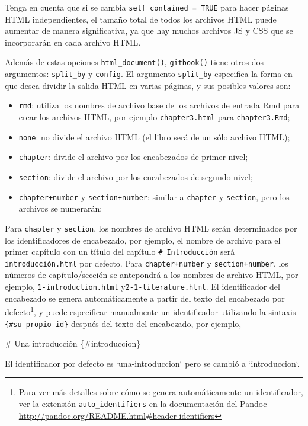 \documentclass[12pt,]{krantz}
\makeatletter
\newenvironment{Shaded}{\begin{snugshade}}{\end{snugshade}}
\newcommand{\BaseNTok}[1]{\textcolor[rgb]{0.00,0.00,0.81}{#1}}
\newcommand{\FunctionTok}[1]{\textcolor[rgb]{0.00,0.00,0.00}{#1}}
\newcommand{\NormalTok}[1]{#1}
\providecommand{\tightlist}{%
  \setlength{\itemsep}{0pt}\setlength{\parskip}{0pt}}
\newenvironment{kframe}{%
\medskip{}
\setlength{\fboxsep}{.8em}
 \def\at@end@of@kframe{}%
 \ifinner\ifhmode%
  \def\at@end@of@kframe{\end{minipage}}%
  \begin{minipage}{\columnwidth}%
 \fi\fi%
 \def\FrameCommand##1{\hskip\@totalleftmargin \hskip-\fboxsep
 \colorbox{shadecolor}{##1}\hskip-\fboxsep
     \hskip-\linewidth \hskip-\@totalleftmargin \hskip\columnwidth}%
 \MakeFramed {\advance\hsize-\width
   \@totalleftmargin\z@ \linewidth\hsize
   \@setminipage}}%
 {\par\unskip\endMakeFramed%
 \at@end@of@kframe}
\renewenvironment{Shaded}{\begin{kframe}}{\end{kframe}}
\theoremstyle{definition}
\theoremstyle{definition}
\theoremstyle{definition}
\theoremstyle{remark}
\makeatother
\begin{document}
Tenga en cuenta que si se cambia \texttt{self\_contained\ =\ TRUE} para
hacer páginas HTML independientes, el tamaño total de todos los archivos
HTML puede aumentar de manera significativa, ya que hay muchos archivos
JS y CSS que se incorporarán en cada archivo HTML.

Además de estas opciones \texttt{html\_document()}, \texttt{gitbook()}
tiene otros dos argumentos: \texttt{split\_by} y \texttt{config}. El
argumento \texttt{split\_by} especifica la forma en que desea dividir la
salida HTML en varias páginas, y sus posibles valores son:

\begin{itemize}
\tightlist
\item
  \texttt{rmd}: utiliza los nombres de archivo base de los archivos de
  entrada Rmd para crear los archivos HTML, por ejemplo
  \texttt{chapter3.html} para \texttt{chapter3.Rmd};
\item
  \texttt{none}: no divide el archivo HTML (el libro será de un sólo
  archivo HTML);
\item
  \texttt{chapter}: divide el archivo por los encabezados de primer
  nivel;
\item
  \texttt{section}: divide el archivo por los encabezados de segundo
  nivel;
\item
  \texttt{chapter+number} y \texttt{section+number}: similar a
  \texttt{chapter} y \texttt{section}, pero los archivos se numerarán;
\end{itemize}

Para \texttt{chapter} y \texttt{section}, los nombres de archivo HTML
serán determinados por los identificadores de encabezado, por ejemplo,
el nombre de archivo para el primer capítulo con un título del capítulo
\texttt{\#\ Introducción} será \texttt{introducción.html} por defecto.
Para \texttt{chapter+number} y \texttt{section+number}, los números de
capítulo/sección se antepondrá a los nombres de archivo HTML, por
ejemplo, \texttt{1-introduction.html} y\texttt{2-1-literature.html}. El
identificador del encabezado se genera automáticamente a partir del
texto del encabezado por defecto\footnote{Para ver más detalles sobre
  cómo se genera automáticamente un identificador, ver la extensión
  \texttt{auto\_identifiers} en la documentación del Pandoc
  \url{http://pandoc.org/README.html\#header-identifiers}}, y puede
especificar manualmente un identificador utilizando la sintaxis
\texttt{\{\#su-propio-id\}} después del texto del encabezado, por
ejemplo,

\begin{Shaded}
\begin{Highlighting}[]
\FunctionTok{# Una introducción \{#introduccion\}}

\NormalTok{El identificador por defecto es }\BaseNTok{`una-introduccion`}\NormalTok{ pero se cambió a }\BaseNTok{`introduccion`}\NormalTok{.}
\end{Highlighting}
\end{Shaded}
\end{document}
